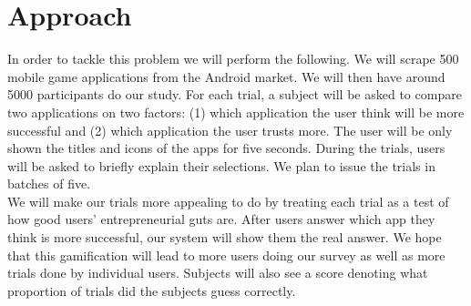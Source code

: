 \section{Approach}

In order to tackle this problem we will perform the following. We will scrape 500 mobile game applications from the Android market. We will then have around 5000 participants do our study. For each trial, a subject will be asked to compare two applications on two factors: (1) which application the user think will be more successful and (2) which application the user trusts more. The user will be only shown the titles and icons of the apps for five seconds. During the trials, users will be asked to briefly explain their selections. We plan to issue the trials in batches of five. \\

We will make our trials more appealing to do by treating each trial as a test of how good users' entrepreneurial guts are. After users answer which app they think is more successful, our system will show them the real answer. We hope that this gamification will lead to more users doing our survey as well as more trials done by individual users. Subjects will also see a score denoting what proportion of trials did the subjects guess correctly.

